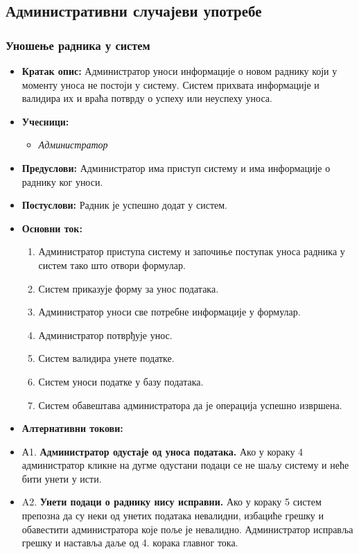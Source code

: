 \documentclass{article}
\begin{document}
\subsection{Административни случајеви употребе}

\subsubsection{Уношење радника у систем}

\begin{itemize}
    \item \textbf{Кратак опис:} Администратор уноси информације о новом раднику који у моменту уноса не постоји у систему. Систем прихвата информације и валидира их и враћа потврду о успеху или неуспеху уноса.
    \item \textbf{Учесници:}
        \begin{itemize}
            \item \textit{Администратор}
        \end{itemize}
    \item \textbf{Предуслови:} Администратор има приступ систему и има информације о раднику ког уноси.
    \item \textbf{Постуслови:} Радник је успешно додат у систем.
    \item \textbf{Основни ток:}
        \begin{enumerate}
            \item Администратор приступа систему и започиње поступак уноса радника у систем тако што отвори формулар.
            \item Систем приказује форму за унос података.
            \item Администратор уноси све потребне информације у формулар.
            \item Администратор потврђује унос.
            \item Систем валидира унете податке.
            \item Систем уноси податке у базу података.
            \item Систем обавештава администратора да је операција успешно извршена.
        \end{enumerate}
    
    \item \textbf{Алтернативни токови:}
    \item А1. \textbf{Администратор одустаје од уноса података.} Ако у кораку 4 администратор кликне на дугме одустани подаци се не шаљу систему и неће бити унети у исти.
    \item A2. \textbf{Унети подаци о раднику нису исправни.} Ако у кораку 5 систем препозна да су неки од унетих података невалидни, избациће грешку и обавестити администратора које поље је невалидно. Администратор исправља грешку и наставља даље од 4. корака главног тока. 
\end{itemize}
\end{document}
